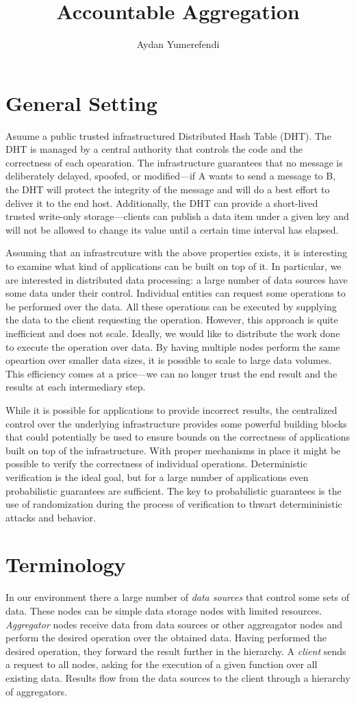 \documentclass{article}
\title{Accountable Aggregation}
\author{Aydan Yumerefendi}
\begin{document}
\section{General Setting}
Asuume a public trusted infrastructured Distributed Hash Table
(DHT). The DHT is managed by a central authority that controls the
code and the correctness of each opearation. The infrastructure
guarantees that no message is deliberately delayed, spoofed, or
modified---if A wants to send a message to B, the DHT will protect the
integrity of the message and will do a best effort to deliver it to
the end host. Additionally, the DHT can provide a short-lived trusted
write-only storage---clients can publish a data item under a given key
and will not be allowed to change its value until a certain time
interval has elapsed.

Assuming that an infrastrcuture with the above properties exists, it
is interesting to examine what kind of applications can be built on
top of it. In particular, we are interested in distributed data processing: a
large number of data sources have some data under their
control. Individual entities can request some operations to be
performed over the data. All these operations can be executed by
supplying the data to the client requesting the operation. However,
this approach is quite inefficient and does not scale. Ideally, we
would like to distribute the work done to execute the operation over
data. By having multiple nodes perform the same opeartion over smaller
data sizes, it is possible to scale to large data volumes. This
efficiency comes at a price---we can no longer trust the end result
and the results at each intermediary step.

While it is possible for applications to provide incorrect results,
the centralized control over the underlying infrastructure provides some
powerful building blocks that could potentially be used to ensure
bounds on the correctness of applications built on top of the
infrastructure. With proper mechanisms in place it might be possible
to verify the correctness of individual operations. Deterministic
verification is the ideal goal, but for a large number of applications
even probabilistic guarantees are sufficient. The key to probabilistic
guarantees is the use of randomization during the process of
verification to thwart determininistic attacks and behavior.


\section{Terminology}
In our environment there a large number of \emph{data sources} that
control some sets of data. These nodes can be simple data storage
nodes with limited resources. \emph{Aggregator} nodes receive data
from data sources or other aggreagator nodes and perform the desired
operation over the obtained data. Having performed the desired
operation, they forward the result further in the
hierarchy. A \emph{client} sends a request to all 
nodes, asking for the execution of a given function over all existing
data. Results flow from the data sources to the client through a hierarchy of
aggregators.
\end{document}
